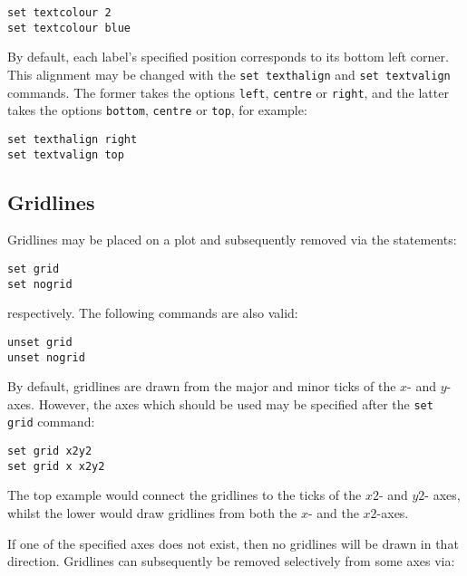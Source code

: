 \documentclass[a4paper,onecolumn,11pt]{book}
\begin{document}
\begin{verbatim}
set textcolour 2
set textcolour blue
\end{verbatim}

By default, each label's specified position corresponds to its bottom left corner. This alignment may be changed with the \texttt{set texthalign} and \texttt{set textvalign} commands. The former takes the options \texttt{left}, \texttt{centre} or \texttt{right}, and the latter takes the options \texttt{bottom}, \texttt{centre} or \texttt{top}, for example:

\begin{verbatim}
set texthalign right
set textvalign top
\end{verbatim}

\subsection{Gridlines}

Gridlines may be placed on a plot and subsequently removed via the statements:

\begin{verbatim}
set grid
set nogrid
\end{verbatim}

\noindent respectively. The following commands are also valid:

\begin{verbatim}
unset grid
unset nogrid
\end{verbatim}

\noindent By default, gridlines are drawn from the major and minor ticks of the
$x$- and $y$-axes. However, the axes which should be used may be specified
after the \texttt{set grid} command:

\begin{verbatim}
set grid x2y2
set grid x x2y2
\end{verbatim}

\noindent The top example would connect the gridlines to the ticks of the $x2$-
and $y2$- axes, whilst the lower would draw gridlines from both the $x$- and
the $x2$-axes.

If one of the specified axes does not exist, then no gridlines will be drawn in
that direction.  Gridlines can subsequently be removed selectively from some
axes via:
\end{document}
